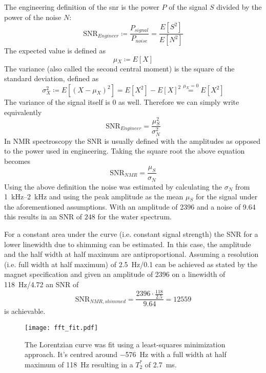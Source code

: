 The engineering definition of the \acrshort{snr} is the power \(P\) of the signal \(S\) divided by the power of the noise \(N\):
\[
    \text{SNR}_{Engineer} \coloneqq \frac{P_{signal}}{P_{noise}} = \frac{E[S^2]}{E[N^2]}
\]
The expected value is defined as
\[
    \mu{}_X \coloneqq E[X]
\]
The variance (also called the second central moment) is the square of the standard deviation, defined as
\[
    \sigma{}_X^2 \coloneqq E[(X-\mu{}_X)^2] = E[X^2] - E[X]^2 \stackrel{\mu{}_X = 0}{=} E[X^2]
\]
The variance of the signal itself is \(0\) as well. Therefore we can simply write equivalently
\[
    \text{SNR}_{Engineer} = \frac{\mu{}_S^2}{\sigma{}_N^2}
\]
In NMR spectroscopy the SNR is usually defined with the amplitudes as opposed to the power used in engineering. Taking the square root the above equation becomes
\[
    \text{SNR}_{NMR} = \frac{\mu_S}{\sigma_N}
\]
Using the above definition the noise was estimated by calculating the \(\sigma{}_N\) from \qtyrange{1}{2}{\kilo\hertz} and using the peak amplitude as the mean \(\mu{}_S\) for the signal under the aforementioned assumptions. With an amplitude of 2396 and a noise of 9.64 this results in an SNR of \(248\) for the water spectrum.

For a constant area under the curve (i.e. constant signal strength) the SNR for a lower linewidth due to shimming can be estimated. In this case, the amplitude and the half width at half maximum are antiproportional. Assuming a resolution (i.e. full width at half maximum) of \qty{2.5}{\hertz}/\qty{0.1}{\partspermillion} can be achieved as stated by the magnet specification and given an amplitude of 2396 on a linewidth of \qty{118}{\hertz}/\qty{4.72}{\partspermillion} an SNR of
\[
    \text{SNR}_{NMR,shimmed} = \frac{2396 \cdot \frac{118}{2.5}}{9.64} = \num{12559}
\]
is achievable.

\begin{figure}[h!bt]
    \centering
    \texttt{[image: fft\_fit.pdf]}
    \caption{ The Lorentzian curve was fit using a least-squares minimization approach. It's centred around \qty{-576}{\hertz} with a full width at half maximum of \qty{118}{\hertz} resulting in a \(T_2^*\) of \qty{2.7}{\milli\second}.}
\end{figure}

